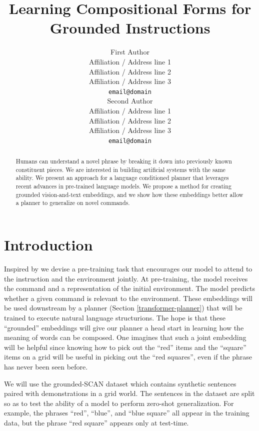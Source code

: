 \documentclass[11pt]{article}
\title{Learning Compositional Forms for Grounded Instructions}
\author{First Author \\
  Affiliation / Address line 1 \\
  Affiliation / Address line 2 \\
  Affiliation / Address line 3 \\
  \texttt{email@domain} \\\And
  Second Author \\
  Affiliation / Address line 1 \\
  Affiliation / Address line 2 \\
  Affiliation / Address line 3 \\
  \texttt{email@domain} \\}
\begin{document}
\maketitle
\begin{abstract}
Humans can understand a novel phrase by breaking it down into previously known constituent pieces. 
%
We are interested in building artificial systems with the same ability.
%
We present an approach for a language conditioned planner that leverages recent advances in pre-trained language models.
%
We propose a method for creating grounded vision-and-text embeddings, and we show how these embeddings better allow a planner to generalize on novel commands.
\end{abstract}

\section{Introduction}
Inspired by \cite{Lu2019ViLBERTPT} we devise a pre-training task that encourages our model to attend to the instruction and the environment jointly. 
%
At pre-training, the model receives the command and a representation of the initial environment. 
%
The model predicts whether a given command is relevant to the environment.
%
These embeddings will be used downstream by a planner (Section \ref{transformer-planner}) that will be trained to execute natural language structurions.
%
The hope is that these ``grounded'' embeddings will give our planner a head start in learning how the meaning of words can be composed.
%
One imagines that such a joint embedding will be helpful since knowing how to pick out the ``red'' items and the ``square''  items on a grid will be useful in picking out the ``red squares'', even if the phrase has never been seen before.

We will use the grounded-SCAN dataset \cite{ruis2020benchmark} which contains synthetic sentences paired with demonstrations in a grid world.
%
The sentences in the dataset are split so as to test the ability of a model to perform zero-shot generalization.
%
For example, the phrases ``red'', ``blue'', and ``blue square'' all appear in the training data, but the phrase ``red square'' appears only at test-time.
\end{document}
